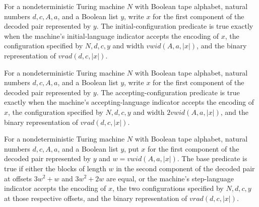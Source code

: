 \begin{definition}
\label{Complexity.TQBFHard.initB}
\leanok
{}
For a nondeterministic Turing machine $N$ with Boolean tape alphabet, natural numbers
$d,c,A,a$, and a Boolean list $y$, write $x$ for the first component of the decoded pair
represented by $y$. The initial-configuration predicate is true exactly when the
machine's initial-language indicator accepts the encoding of $x$, the configuration
specified by $N,d,c,y$ and width $vwid(A,a,|x|)$, and the binary representation of
$vrad(d,c,|x|)$.
\end{definition}

\begin{definition}
\label{Complexity.TQBFHard.accB}
\leanok
{}
For a nondeterministic Turing machine $N$ with Boolean tape alphabet, natural numbers
$d,c,A,a$, and a Boolean list $y$, write $x$ for the first component of the decoded pair
represented by $y$. The accepting-configuration predicate is true exactly when the
machine's accepting-language indicator accepts the encoding of $x$, the configuration
specified by $N,d,c,y$ and width $2vwid(A,a,|x|)$, and the binary representation of
$vrad(d,c,|x|)$.
\end{definition}

\begin{definition}
\label{Complexity.TQBFHard.baseB}
\leanok
{}
For a nondeterministic Turing machine $N$ with Boolean tape alphabet, natural numbers
$d,c,A,a$, and a Boolean list $y$, put $x$ for the first component of the decoded pair
represented by $y$ and $w=vwid(A,a,|x|)$. The base predicate is true if either the
blocks of length $w$ in the second component of the decoded pair at offsets $3w^2+w$ and
$3w^2+2w$ are equal, or the machine's step-language indicator accepts the encoding of
$x$, the two configurations specified by $N,d,c,y$ at those respective offsets, and the
binary representation of $vrad(d,c,|x|)$.
\end{definition}


